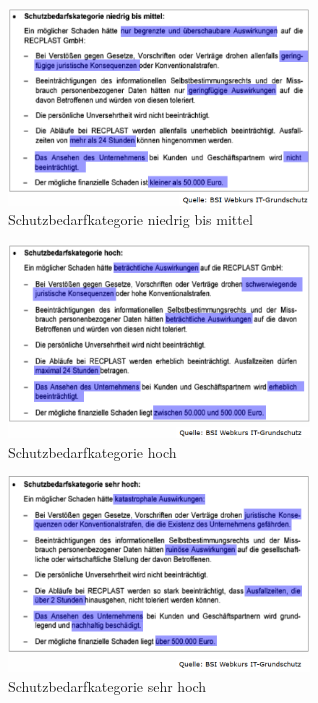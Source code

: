 \documentclass[10pt,a4paper]{article}
\begin{document}
\begin{figure}[H]
    \begin{center}
    \includegraphics[width=8cm]{images/Schutzbedarf_ex1.png}
    \caption{Schutzbedarfkategorie niedrig bis mittel}
    \label{Schutzbedarfkategorie Ex.1}
    \end{center}
\end{figure}
\begin{figure}[H]
    \begin{center}
    \includegraphics[width=8cm]{images/Schutzbedarf_ex2.png}
    \caption{Schutzbedarfkategorie hoch}
    \label{Schutzbedarfkategorie Ex.2}
    \end{center}
\end{figure}
\begin{figure}[H]
    \begin{center}
    \includegraphics[width=8cm]{images/Schutzbedarf_ex3.png}
    \caption{Schutzbedarfkategorie sehr hoch}
    \label{Schutzbedarfkategorie Ex.3}
    \end{center}
\end{figure}
\end{document}
